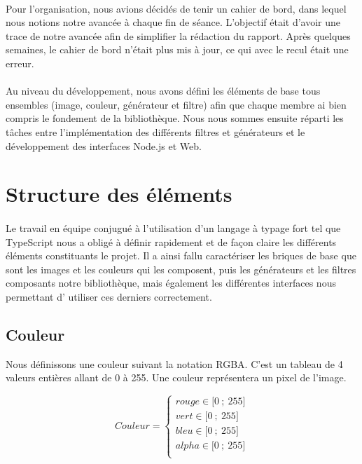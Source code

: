 \documentclass{article}
\begin{document}
\paragraph{}
Pour l'organisation, nous avions décidés de tenir un cahier de bord, dans lequel nous notions notre avancée à chaque fin de séance. L'objectif était d'avoir une trace de notre avancée afin de simplifier la rédaction du rapport. Après quelques semaines, le cahier de bord n'était plus mis à jour, ce qui avec le recul était une erreur.

\paragraph{}
Au niveau du développement, nous avons défini les éléments de base tous ensembles (image, couleur, générateur et filtre) afin que chaque membre ai bien compris le fondement de la bibliothèque. Nous nous sommes ensuite réparti les tâches entre l'implémentation des différents filtres et générateurs et le développement des interfaces Node.js et Web.

\section{Structure des éléments}

\paragraph{}
Le travail en équipe conjugué à l'utilisation d'un langage à typage fort tel que TypeScript nous a obligé à définir rapidement et de façon claire les différents éléments constituants le projet. Il a ainsi fallu caractériser les briques de base que sont les images et les couleurs qui les composent, puis les générateurs et les filtres composants notre bibliothèque, mais également les différentes interfaces nous permettant d' utiliser ces derniers correctement.

\subsection{Couleur}

Nous définissons une couleur suivant la notation RGBA. C'est un tableau de 4 valeurs entières allant de 0 à 255. Une couleur représentera un pixel de l'image.

\begin{equation*}
    Couleur = \left\{\begin{matrix}
            rouge \in \mathopen{[} 0~;~255 \mathclose{]}  \\
            vert \in \mathopen{[} 0~;~255 \mathclose{]}  \\
            bleu \in \mathopen{[} 0~;~255 \mathclose{]}  \\
            alpha \in \mathopen{[} 0~;~255 \mathclose{]}  \\
\end{matrix}\right.
\end{equation*}
\end{document}
